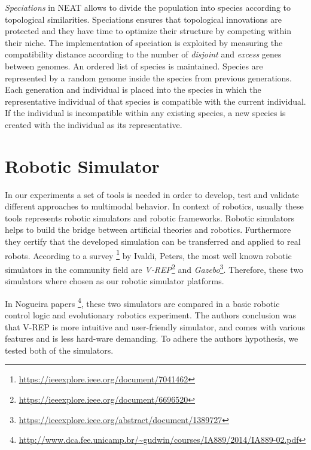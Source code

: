 \documentclass[format=acmsmall, review=false, screen=true]{acmart}
\begin{document}
\emph{Speciations} in NEAT allows to divide the population into species according to topological similarities. Speciations ensures that topological innovations are protected and they have time to optimize their structure by competing within their niche. The implementation of speciation is exploited by measuring the compatibility distance according to the number of \emph{disjoint} and \emph{excess} genes between genomes. An ordered list of species is maintained. Species are represented by a random genome inside the species from previous generations. Each generation and individual is placed into the species in which the representative individual of that species is compatible with the current individual. If the individual is incompatible within any existing species, a new species is created with the individual as its representative. 


\section{Robotic Simulator}

In our experiments a set of tools is needed in order to develop, test and validate different approaches to multimodal behavior. In context of robotics, usually these tools represents robotic simulators and robotic frameworks. Robotic simulators helps to build the bridge between artificial theories and robotics. Furthermore they certify that the developed simulation can be transferred and applied to real robots. According to a survey \footnote{\url{https://ieeexplore.ieee.org/document/7041462}} by Ivaldi, Peters, the most well known robotic simulators in the community field are \emph{V-REP}\footnote{\url{https://ieeexplore.ieee.org/document/6696520}} and \emph{Gazebo}\footnote{\url{https://ieeexplore.ieee.org/abstract/document/1389727}}. Therefore, these two simulators where chosen as our robotic simulator platforms.

In Nogueira papers \footnote{\url{http://www.dca.fee.unicamp.br/~gudwin/courses/IA889/2014/IA889-02.pdf}}, these two simulators are compared in a basic robotic control logic and evolutionary robotics experiment. The authors conclusion was that V-REP is more intuitive and user-friendly simulator, and comes with various features and is less hard-ware demanding. To adhere the authors hypothesis, we tested both of the simulators.
\end{document}
